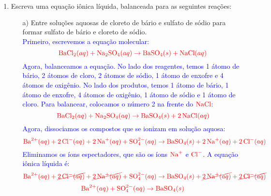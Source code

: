 \documentclass[a4paper, 12pt]{article}
\begin{document}
\begin{enumerate}

    \item Escreva uma equação iônica líquida, balanceada para as seguintes reações:
          \begin{enumerate}[align=left, labelsep=-0.5em]
              \item[a)] Entre soluções aquosas de cloreto de bário e sulfato de sódio para formar sulfato de bário e cloreto de sódio.
                    \\[10pt]
                    \textcolor{blue}{Primeiro, escrevemos a equação molecular:}
                    \[
                        \textcolor{red}{\text{BaCl}_2 (aq) + \text{Na}_2\text{SO}_4 (aq) \rightarrow \text{BaSO}_4 (s) + \text{NaCl} (aq)}
                    \]
                    \textcolor{blue}{Agora, balanceamos a equação. No lado dos reagentes, temos 1 átomo de bário, 2 átomos de cloro, 2 átomos de sódio, 1 átomo de enxofre e 4 átomos de oxigênio. No lado dos produtos, temos 1 átomo de bário, 1 átomo de enxofre, 4 átomos de oxigênio, 1 átomo de sódio e 1 átomo de cloro. Para balancear, colocamos o número 2 na frente do \(\textcolor{red}{\text{NaCl}}\):}
                    \[
                        \textcolor{red}{\text{BaCl}_2 (aq) + \text{Na}_2\text{SO}_4 (aq) \rightarrow \text{BaSO}_4 (s) + 2 \, \text{NaCl} (aq)}
                    \]
                    \textcolor{blue}{Agora, dissociamos os compostos que se ionizam em solução aquosa:}
                    \[
                        \textcolor{red}{\text{Ba}^{2+} (aq) + 2 \, \text{Cl}^- (aq) + 2 \, \text{Na}^+ (aq) + \text{SO}_4^{2-} (aq) \rightarrow \text{BaSO}_4 (s) + 2 \, \text{Na}^+ (aq) + 2 \, \text{Cl}^- (aq)}
                    \]
                    \textcolor{blue}{Eliminamos os íons espectadores, que são os íons \(\textcolor{red}{\text{Na}^+}\) e \(\textcolor{red}{\text{Cl}^-}\). A equação iônica líquida é:}
                    \[
                        \textcolor{red}{\text{Ba}^{2+} (aq) + \cancel{2 \, \text{Cl}^- (aq)} + \cancel{2 \, \text{Na}^+ (aq)} + \text{SO}_4^{2-} (aq) \rightarrow \text{BaSO}_4 (s) + \cancel{2 \, \text{Na}^+ (aq)} + \cancel{2 \, \text{Cl}^- (aq)}}
                    \]
                    \[
                        \textcolor{red}{\text{Ba}^{2+} (aq) + \text{SO}_4^{2-} (aq) \rightarrow \text{BaSO}_4 (s)}
                    \]


\end{enumerate}
\end{enumerate}
\end{document}

